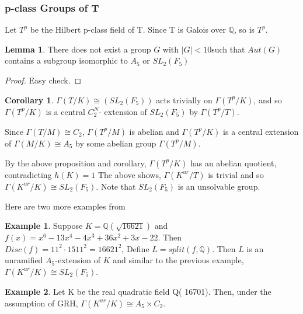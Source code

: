 \documentclass[12pt]{extarticle}
\newcommand{\Q}{\mathbb{Q}}
\newcommand{\<}{\langle}
\renewcommand{\>}{\rangle}
\theoremstyle{definition}
\newtheorem{corollary}{Corollary}
\newtheorem*{example}{Example}
\newtheorem{lemma}{Lemma}
\begin{document}
\subsubsection{p-class Groups of T}

Let $T^p$ be the Hilbert p-class field of T. Since T is Galois over $\Q$, so is $T^p$.
\begin{lemma}
There does not exist a group $G$ with $|G| < 10 $such that $Aut(G)$ contains a subgroup isomorphic to $A_5$ or $SL_2(F_5)$
\end{lemma}
\begin{proof}
Easy check. 
\end{proof}
\begin{corollary}
 $\Gamma(T/K) \cong (SL_2(F_5))$ acts trivially on $\Gamma(T^p/K)$, and so $\Gamma(T^p/K)$ is a central $C_2^N$- extension of $SL_2(F_5)$ by $\Gamma(T^p/T)$. \par
Since $\Gamma(T/M) \cong C_2$, $\Gamma(T^p/M)$ is abelian and $\Gamma(T^p/K)$ is a central extension of $\Gamma(M/K) \cong A_5$ by some abelian group $\Gamma(T^p/M)$.
\end{corollary}
 By the above proposition and corollary, $\Gamma(T^p/K)$ has an abelian quotient, contradicting $h(K)=1$
The above shows, $\Gamma(K^{ur}/T)$ is trivial and so $\Gamma(K^{ur}/K) \cong SL_2(F_5)$. Note that $SL_2(F_5)$ is an unsolvable group. 
 \par
Here are two more examples from \cite{KIM2017}
\begin{example}
Suppose $K = \Q(\sqrt{16621})$ and $f(x) = x^6-13x^4-4x^3 +36x^2 +3x-22$. Then $Disc(f) = 11^2 \cdot 1511^2 = 16621^2$, Define $L= split(f,\Q)$. Then $L$ is an unramified $A_5$-extension of $K$ and similar to the previous example, $\Gamma(K^{ur}/K) \cong SL_2(F_5)$.
\end{example}
\begin{example}
Let K be the real quadratic field Q( 16701). Then, under the assumption of GRH,  $\Gamma(K^{ur}/K) \cong A_5 \times C_2$.
\end{example}
 







\end{document}
